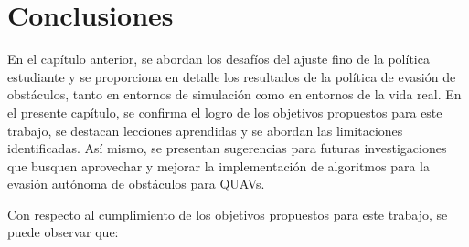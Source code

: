 \chapter{Conclusiones}
\label{capitulo7}

En el capítulo anterior, se abordan los desafíos del ajuste fino de la política estudiante y se proporciona en detalle los resultados de la política de evasión de obstáculos, tanto en entornos de simulación como en entornos de la vida real. En el presente capítulo, se confirma el logro de los objetivos propuestos para este trabajo, se destacan lecciones aprendidas y se abordan las limitaciones identificadas. Así mismo, se presentan sugerencias para futuras investigaciones que busquen aprovechar y mejorar la implementación de algoritmos para la evasión autónoma de obstáculos para QUAVs.

Con respecto al cumplimiento de los objetivos propuestos para este trabajo, se puede observar que: 

